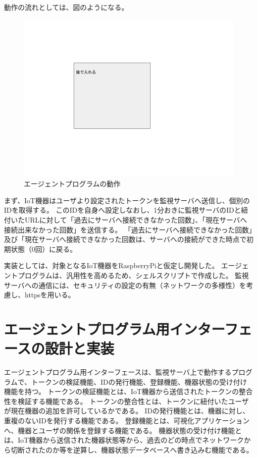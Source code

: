 動作の流れとしては、図のようになる。
\begin{figure}[htbp]
\includegraphics[width=16cm]{images/test.png}
\caption{エージェントプログラムの動作}
\label{fig:agent_flow}
\end{figure}
まず、IoT機器はユーザより設定されたトークンを監視サーバへ送信し、個別のIDを取得する。
このIDを自身へ設定しなおし、1分おきに監視サーバのIDと紐付いたURLに対して「過去にサーバへ接続できなかった回数」、「現在サーバへ接続出来なかった回数」を送信する。
「過去にサーバへ接続できなかった回数」及び「現在サーバへ接続できなかった回数は、サーバへの接続ができた時点で初期状態（0回）に戻る。

実装としては、対象となるIoT機器をRaspberryPiと仮定し開発した。
エージェントプログラムは、汎用性を高めるため、シェルスクリプトで作成した。
監視サーバへの通信には、セキュリティの設定の有無（ネットワークの多様性）を考慮し、httpsを用いる。

\section{エージェントプログラム用インターフェースの設計と実装}
エージェントプログラム用インターフェースは、監視サーバ上で動作するプログラムで、トークンの検証機能、IDの発行機能、登録機能、機器状態の受け付け機能を持つ。
トークンの検証機能とは、IoT機器から送信されたトークンの整合性を検証する機能である。
トークンの整合性とは、トークンに紐付いたユーザが現在機器の追加を許可しているかである。
IDの発行機能とは、機器に対し、重複のないIDを発行する機能である。
登録機能とは、可視化アプリケーションへ、機器とユーザの関係を登録する機能である。
機器状態の受け付け機能とは、IoT機器から送信された機器状態等から、過去のどの時点でネットワークから切断されたのか等を逆算し、機器状態データベースへ書き込みむ機能である。

